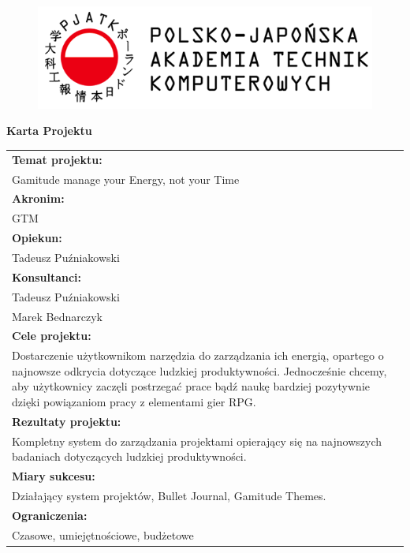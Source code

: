 \documentclass[a4paper,11pt]{report}
\begin{document}
\let\cleardoublepage\clearpage
\begin{figure}[ht]
\centering
\includegraphics{pjatk.png}
\end{figure}
\begin{center}
\textbf{\huge Karta Projektu}\\
\vspace{1cm}
\begin{tabular}{|p{15cm}|}
\hline
\textbf{Temat projektu:}\\Gamitude manage your Energy, not your Time\\ 
\hline
\textbf{Akronim:}\\GTM\\
\hline
\textbf{Opiekun:}\\Tadeusz Puźniakowski  \\
\hline
\textbf{Konsultanci:}\\Tadeusz Puźniakowski\\Marek Bednarczyk \\
\hline
\textbf{Cele projektu:}
\\Dostarczenie użytkownikom narzędzia do zarządzania ich energią,
 opartego o najnowsze odkrycia dotyczące ludzkiej produktywności.
Jednocześnie chcemy,
 aby użytkownicy zaczęli postrzegać prace bądź naukę bardziej pozytywnie dzięki powiązaniom pracy z elementami gier RPG.\\
\hline
\textbf{Rezultaty projektu:}\\Kompletny system do zarządzania projektami opierający się na najnowszych badaniach dotyczących ludzkiej produktywności. \\
\hline
\textbf{Miary sukcesu:}\\Działający system projektów, Bullet Journal, Gamitude Themes.\\
\hline
\textbf{Ograniczenia:}\\Czasowe, umiejętnościowe, budżetowe \\
\hline
\end{tabular}\\
\vspace{1cm}
\begin{tabular}{|l|l|l|l|}

\end{tabular}
\end{center}
\end{document}
